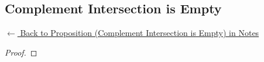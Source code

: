 
\subsection*{Complement Intersection is Empty}
\label{prf:complement-intersection}

\begin{remark*}[Return]
\hyperref[prop:complement-intersection]{$\leftarrow$ Back to Proposition (Complement Intersection is Empty) in Notes}
\end{remark*}

\begin{proof}
\end{proof}

\begin{remark*}

\end{remark*}

\begin{remark*}[Dependencies]

\FlashUses{}
\end{remark*}
